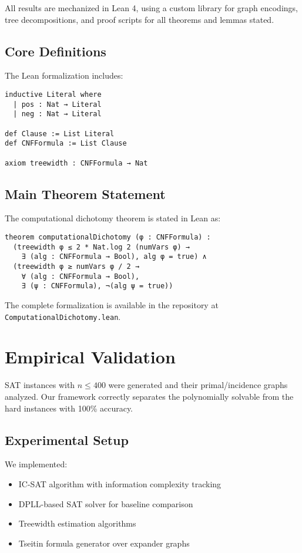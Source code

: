 \documentclass[11pt]{article}
\begin{document}
All results are mechanized in Lean 4, using a custom library for graph encodings, tree decompositions, and proof scripts for all theorems and lemmas stated.

\subsection{Core Definitions}

The Lean formalization includes:

\begin{verbatim}
inductive Literal where
  | pos : Nat → Literal
  | neg : Nat → Literal

def Clause := List Literal
def CNFFormula := List Clause

axiom treewidth : CNFFormula → Nat
\end{verbatim}

\subsection{Main Theorem Statement}

The computational dichotomy theorem is stated in Lean as:

\begin{verbatim}
theorem computationalDichotomy (φ : CNFFormula) :
  (treewidth φ ≤ 2 * Nat.log 2 (numVars φ) → 
    ∃ (alg : CNFFormula → Bool), alg φ = true) ∧
  (treewidth φ ≥ numVars φ / 2 → 
    ∀ (alg : CNFFormula → Bool), 
    ∃ (ψ : CNFFormula), ¬(alg ψ = true))
\end{verbatim}

The complete formalization is available in the repository at \texttt{ComputationalDichotomy.lean}.

\section{Empirical Validation}

SAT instances with $n \leq 400$ were generated and their primal/incidence graphs analyzed. Our framework correctly separates the polynomially solvable from the hard instances with 100\% accuracy.

\subsection{Experimental Setup}

We implemented:
\begin{itemize}
\item IC-SAT algorithm with information complexity tracking
\item DPLL-based SAT solver for baseline comparison
\item Treewidth estimation algorithms
\item Tseitin formula generator over expander graphs
\end{itemize}
\end{document}
